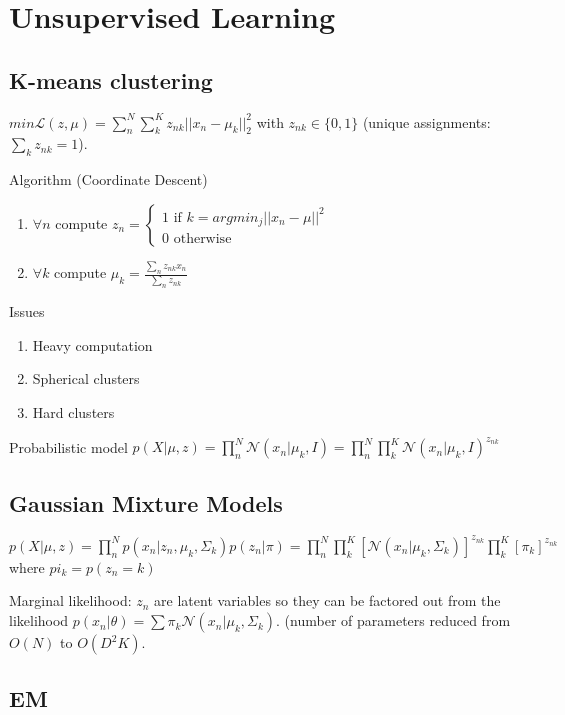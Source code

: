 \section{Unsupervised Learning}
\subsection{K-means clustering}

$min \mathcal{L}(z,\mu) = \sum_n^N \sum_k^K z_{nk} ||x_n - \mu_k||^2_2$ with $z_{nk} \in \{0,1\}$ (unique assignments: $\sum_k z_{nk} = 1$).

Algorithm (Coordinate Descent)
\begin{enumerate}
\item $\forall n$ compute $z_n = \begin{cases} 
	1 \text{ if } k = argmin_j || x_n - \mu||^2 \\
	0 \text{ otherwise }
   \end{cases}$
\item $\forall k$ compute $\mu_k = \frac{\sum_n z_{nk} x_n}{\sum_n z_{nk}}$
\end{enumerate}

Issues
\begin{enumerate}
	\item Heavy computation
	\item Spherical clusters
	\item Hard clusters
\end{enumerate}

Probabilistic model
$p(X|\mu,z) = \prod_n^N \mathcal{N}(x_n|\mu_k,I) = \prod_n^N \prod_k^K \mathcal{N}(x_n|\mu_k,I)^{z_{nk}}$ 

\subsection{Gaussian Mixture Models}
$p(X|\mu,z) = \prod_n^N p(x_n|z_n,\mu_k,\Sigma_k)p(z_n|\pi) 
= \prod_n^N \prod_k^K [\mathcal{N}(x_n|\mu_k,\Sigma_k)]^{z_{nk}} \prod_k^K [\pi_k]^{z_{nk}}$ where $pi_k = p(z_n=k)$

Marginal likelihood: $z_n$ are latent variables so they can be factored out from the likelihood $p(x_n|\theta) = \sum \pi_k \mathcal{N}(x_n|\mu_k, \Sigma_k)$. (number of parameters reduced from $O(N)$ to $O(D^2K)$.

\subsection{EM}
